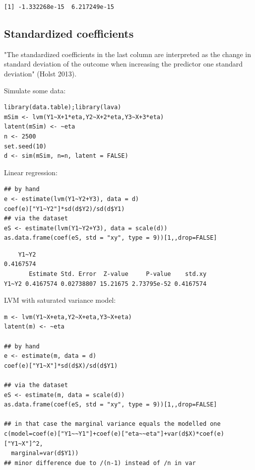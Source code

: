 \documentclass{article}
\begin{document}
\begin{verbatim}
[1] -1.332268e-15  6.217249e-15
\end{verbatim}

\subsection{Standardized coefficients}
\label{sec:org9e6dbed}

"The standardized coefficients in the last column are interpreted as
the change in standard deviation of the outcome when increasing the
predictor one standard deviation" (Holst 2013).

\bigskip

Simulate some data:
\lstset{language=r,label= ,caption= ,captionpos=b,numbers=none}
\begin{lstlisting}
library(data.table);library(lava)
mSim <- lvm(Y1~X+1*eta,Y2~X+2*eta,Y3~X+3*eta)
latent(mSim) <- ~eta
n <- 2500
set.seed(10)
d <- sim(mSim, n=n, latent = FALSE)
\end{lstlisting}

Linear regression:
\lstset{language=r,label= ,caption= ,captionpos=b,numbers=none}
\begin{lstlisting}
## by hand
e <- estimate(lvm(Y1~Y2+Y3), data = d)
coef(e)["Y1~Y2"]*sd(d$Y2)/sd(d$Y1)
## via the dataset
eS <- estimate(lvm(Y1~Y2+Y3), data = scale(d))
as.data.frame(coef(eS, std = "xy", type = 9))[1,,drop=FALSE]
\end{lstlisting}

\begin{verbatim}
    Y1~Y2 
0.4167574
       Estimate Std. Error  Z-value     P-value    std.xy
Y1~Y2 0.4167574 0.02738807 15.21675 2.73795e-52 0.4167574
\end{verbatim}


LVM with saturated variance model:
\lstset{language=r,label= ,caption= ,captionpos=b,numbers=none}
\begin{lstlisting}
m <- lvm(Y1~X+eta,Y2~X+eta,Y3~X+eta)
latent(m) <- ~eta

## by hand
e <- estimate(m, data = d)
coef(e)["Y1~X"]*sd(d$X)/sd(d$Y1)

## via the dataset
eS <- estimate(m, data = scale(d))
as.data.frame(coef(eS, std = "xy", type = 9))[1,,drop=FALSE]

## in that case the marginal variance equals the modelled one
c(model=coef(e)["Y1~~Y1"]+coef(e)["eta~~eta"]+var(d$X)*coef(e)["Y1~X"]^2,
  marginal=var(d$Y1))
## minor difference due to /(n-1) instead of /n in var
\end{lstlisting}
\end{document}
